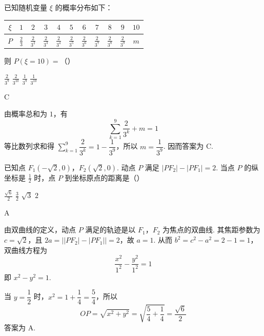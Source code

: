 \begin{problem}
已知随机变量 \(\xi\) 的概率分布如下：

\begin{center}
\begin{tabular}{|c|c|c|c|c|c|c|c|c|c|c|}
\hline
\(\xi\) & \(1\) & \(2\) & \(3\) & \(4\) & \(5\) & \(6\) & \(7\) & \(8\) & \(9\) & \(10\) \\
\hline
\(P\) & \(\frac{2}{3}\) & \(\frac{2}{3^2}\) & \(\frac{2}{3^3}\) & \(\frac{2}{3^4}\) & \(\frac{2}{3^5}\) & \(\frac{2}{3^6}\) & \(\frac{2}{3^7}\) & \(\frac{2}{3^8}\) & \(\frac{2}{3^9}\) & \(m\) \\
\hline
\end{tabular}
\end{center}

则 \(P(\xi = 10) =\)（\quad）

\choices
    {\(\frac{2}{3^9}\)}
    {\(\frac{2}{3^{10}}\)}
    {\(\frac{1}{3^9}\)}
    {\(\frac{1}{3^{10}}\)}
\end{problem}

\begin{answer}C\end{answer}

\begin{solution}
由概率总和为 \(1\)，有
\[
\sum_{k=1}^{9}\frac{2}{3^k}+m=1
\]
等比数列求和得 \(\sum_{k=1}^{9}\dfrac{2}{3^k}=1-\dfrac{1}{3^9}\)，所以
\(m=\dfrac{1}{3^9}\). 因而答案为 C.
\end{solution}

\begin{problem}
已知点 \(F_{1}(-\sqrt{2},0)\)，\(F_{2}(\sqrt{2},0)\). 动点 \(P\) 满足 \(|PF_{2}| - |PF_{1}| = 2\). 当点 \(P\) 的纵坐标是 \(\frac{1}{2}\) 时，点 \(P\) 到坐标原点的距离是（\quad）

\choices
    {\(\frac{\sqrt{6}}{2}\)}
    {\(\frac{3}{2}\)}
    {\(\sqrt{3}\)}
    {\(2\)}
\end{problem}

\begin{answer}A\end{answer}

\begin{solution}
由双曲线的定义，动点 \(P\) 满足的轨迹是以 \(F_1\)，\(F_2\) 为焦点的双曲线. 其焦距参数为 \(c=\sqrt{2}\)，且
\(2a=\left|\lvert PF_2\rvert-\lvert PF_1\rvert\right|=2\)，故 \(a=1\). 从而
\(b^2=c^2-a^2=2-1=1\)，双曲线方程为
\[
\frac{x^2}{1^2}-\frac{y^2}{1^2}=1
\]
即 \(x^2-y^2=1\).

当 \(y=\dfrac12\) 时，\(x^2=1+\dfrac14=\dfrac54\)，所以
\[
OP=\sqrt{x^2+y^2}=\sqrt{\frac54+\frac14}=\frac{\sqrt6}{2}
\]
答案为 A.
\end{solution}

